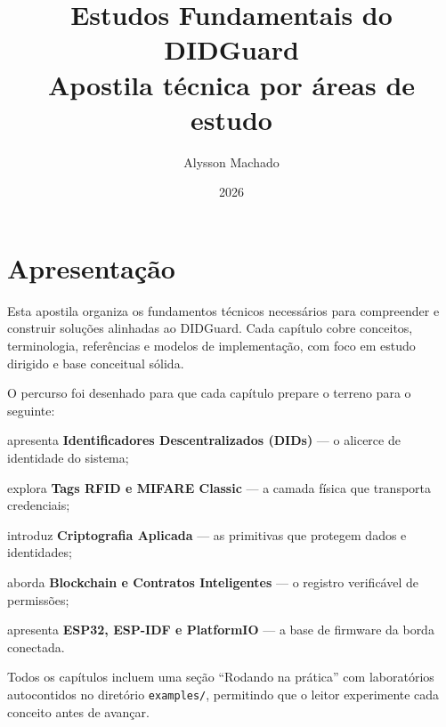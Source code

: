 ﻿\documentclass[12pt,openany]{book}
\title{Estudos Fundamentais do DIDGuard \\\large Apostila técnica por áreas de estudo}
\author{Alysson Machado}
\date{2026}
\begin{document}
\frontmatter
\maketitle

\chapter*{Apresentação}
Esta apostila organiza os fundamentos técnicos necessários para compreender e construir soluções alinhadas ao DIDGuard.
Cada capítulo cobre conceitos, terminologia, referências e modelos de implementação, com foco em estudo dirigido e base conceitual sólida.

O percurso foi desenhado para que cada capítulo prepare o terreno para o seguinte:
\begin{description}[leftmargin=1.2cm, labelwidth=1cm, labelsep=0.2cm]
  \item[Cap.~1] apresenta \textbf{Identificadores Descentralizados (DIDs)} --- o alicerce de identidade do sistema;
  \item[Cap.~2] explora \textbf{Tags RFID e MIFARE Classic} --- a camada física que transporta credenciais;
  \item[Cap.~3] introduz \textbf{Criptografia Aplicada} --- as primitivas que protegem dados e identidades;
  \item[Cap.~4] aborda \textbf{Blockchain e Contratos Inteligentes} --- o registro verificável de permissões;
  \item[Cap.~5] apresenta \textbf{ESP32, ESP-IDF e PlatformIO} --- a base de firmware da borda conectada.
\end{description}

Todos os capítulos incluem uma seção ``Rodando na prática'' com laboratórios autocontidos no diretório \texttt{examples/}, permitindo que o leitor experimente cada conceito antes de avançar.

\tableofcontents


\mainmatter






\backmatter







\end{document}
